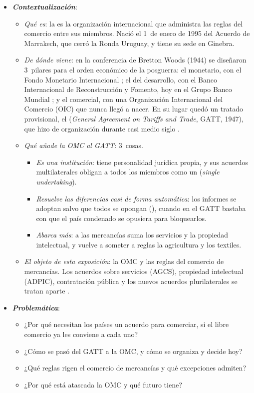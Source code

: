 \documentclass[11pt]{article}
\begin{document}
\begin{itemize}
\item \textbf{\emph{Contextualización}}:
  \begin{itemize}
  \item \emph{Qué es}: la  es la organización internacional que administra las reglas del comercio entre sus miembros. Nació el 1~de enero de 1995 del Acuerdo de Marrakech, que cerró la Ronda Uruguay, y tiene su sede en Ginebra.
  \item \emph{De dónde viene}: en la conferencia de Bretton Woods (1944) se diseñaron 3~pilares para el orden económico de la posguerra: el monetario, con el Fondo Monetario Internacional ; el del desarrollo, con el Banco Internacional de Reconstrucción y Fomento, hoy en el Grupo Banco Mundial ; y el comercial, con una Organización Internacional del Comercio (OIC) que nunca llegó a nacer. En su lugar quedó un tratado provisional, el  (\emph{General Agreement on Tariffs and Trade}, GATT, 1947), que hizo de organización durante casi medio siglo .
  \item \emph{Qué añade la OMC al GATT}: 3~cosas.
    \begin{itemize}
    \item \emph{Es una institución}: tiene personalidad jurídica propia, y sus acuerdos multilaterales obligan a todos los miembros como un  (\emph{single undertaking}).
    \item \emph{Resuelve las diferencias casi de forma automática}: los informes se adoptan salvo que todos se opongan (), cuando en el GATT bastaba con que el país condenado se opusiera para bloquearlos.
    \item \emph{Abarca más}: a las mercancías suma los servicios y la propiedad intelectual, y vuelve a someter a reglas la agricultura y los textiles.
    \end{itemize}
  \item \emph{El objeto de esta exposición}: la OMC y las reglas del comercio de mercancías. Los acuerdos sobre servicios (AGCS), propiedad intelectual (ADPIC), contratación pública y los nuevos acuerdos plurilaterales se tratan aparte .
  \end{itemize}

\item \textbf{\emph{Problemática}}:
  \begin{itemize}
  \item ¿Por qué necesitan los países un acuerdo para comerciar, si el libre comercio ya les conviene a cada uno?
  \item ¿Cómo se pasó del GATT a la OMC, y cómo se organiza y decide hoy?
  \item ¿Qué reglas rigen el comercio de mercancías y qué excepciones admiten?
  \item ¿Por qué está atascada la OMC y qué futuro tiene?
  \end{itemize}


\end{itemize}
\end{document}
